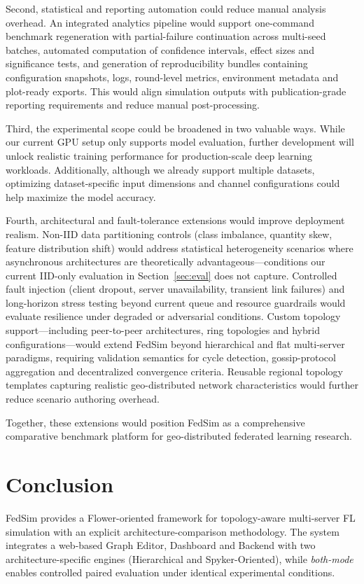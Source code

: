 \documentclass[conference]{IEEEtran}
\begin{document}
Second, statistical and reporting automation could reduce manual analysis overhead. An integrated analytics pipeline would support one-command benchmark regeneration with partial-failure continuation across multi-seed batches, automated computation of confidence intervals, effect sizes and significance tests, and generation of reproducibility bundles containing configuration snapshots, logs, round-level metrics, environment metadata and plot-ready exports. This would align simulation outputs with publication-grade reporting requirements and reduce manual post-processing.

Third, the experimental scope could be broadened in two valuable ways. While our current GPU setup only supports model evaluation, further development will unlock realistic training performance for production-scale deep learning workloads. Additionally, although we already support multiple datasets, optimizing dataset-specific input dimensions and channel configurations could help maximize the model accuracy.

Fourth, architectural and fault-tolerance extensions would improve deployment realism. Non-IID data partitioning controls (class imbalance, quantity skew, feature distribution shift) would address statistical heterogeneity scenarios where asynchronous architectures are theoretically advantageous—conditions our current IID-only evaluation in Section~\ref{sec:eval} does not capture. Controlled fault injection (client dropout, server unavailability, transient link failures) and long-horizon stress testing beyond current queue and resource guardrails would evaluate resilience under degraded or adversarial conditions. Custom topology support—including peer-to-peer architectures, ring topologies and hybrid configurations—would extend FedSim beyond hierarchical and flat multi-server paradigms, requiring validation semantics for cycle detection, gossip-protocol aggregation and decentralized convergence criteria. Reusable regional topology templates capturing realistic geo-distributed network characteristics would further reduce scenario authoring overhead.

Together, these extensions would position FedSim as a comprehensive comparative benchmark platform for geo-distributed federated learning research.

\section{Conclusion}
FedSim provides a Flower-oriented framework for topology-aware multi-server FL simulation with an explicit architecture-comparison methodology. The system integrates a web-based Graph Editor, Dashboard and Backend with two architecture-specific engines (Hierarchical and Spyker-Oriented), while \textit{both-mode} enables controlled paired evaluation under identical experimental conditions.
\end{document}
